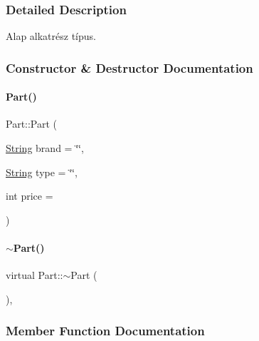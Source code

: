 \subsubsection{Detailed Description}
Alap alkatrész típus. 

\subsubsection{Constructor \& Destructor Documentation}
\mbox{\label{class_part_aae5224ee782134c4ecb60f23ec38698f}} 
\paragraph{\texorpdfstring{Part()}{Part()}}
{\footnotesize\ttfamily Part\+::\+Part (\begin{DoxyParamCaption}\item[{\mbox{\hyperlink{class_string}{String}}}]{brand = {\ttfamily \char`\"{}\char`\"{}},  }\item[{\mbox{\hyperlink{class_string}{String}}}]{type = {\ttfamily \char`\"{}\char`\"{}},  }\item[{int}]{price = {} }\end{DoxyParamCaption})\hspace{0.3cm}{\ttfamily [inline]}}

\mbox{\label{class_part_aaecbb747a7227f7ce3b44caeaf1801c2}} 
\paragraph{\texorpdfstring{$\sim$Part()}{~Part()}}
{\footnotesize\ttfamily virtual Part\+::$\sim$\+Part (\begin{DoxyParamCaption}{ }\end{DoxyParamCaption})\hspace{0.3cm}{\ttfamily [inline]}, {\ttfamily [virtual]}}



\subsubsection{Member Function Documentation}
\mbox{\label{class_part_a38bcd0481433acc24db7d5f978f2c839}} 
